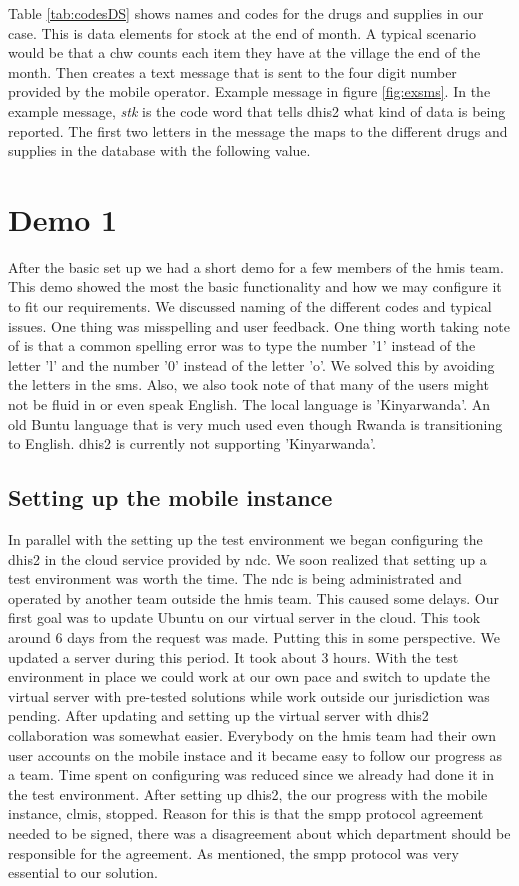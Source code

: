 Table \ref{tab:codesDS} shows names and codes for the drugs and supplies in our case. 
This is data elements for stock at the end of month.
A typical scenario would be that a \gls{chw} counts each item they have at the village the end of the month. Then creates a text message that is sent to the four digit number provided by the mobile operator. Example message in figure \ref{fig:exsms}. In the example message, \textit{stk} is the code word that tells \gls{dhis2} what kind of data is being reported. The first two letters in the message the maps to the different drugs and supplies in the database with the following value.  

\section{Demo 1}
After the basic set up we had a short demo for a few members of the \gls{hmis} team. 
This demo showed the most the basic functionality and how we may configure it to fit our requirements. We discussed naming of the different codes and typical issues. One thing was misspelling and user feedback. 
One thing worth taking note of is that a common spelling error was to type the number '1' instead of the letter 'l' and the number '0' instead of the letter 'o'. We solved this by avoiding the letters in the \gls{sms}. Also, we also took note of that many of the users might not be fluid in or even speak English. The local language is 'Kinyarwanda'. An old Buntu language that is very much used even though Rwanda is transitioning to English. \gls{dhis2} is currently not supporting 'Kinyarwanda'.

\subsection{Setting up the mobile instance}
In parallel with the setting up the test environment we began configuring the \gls{dhis2} in the cloud service provided by \gls{ndc}. 
We soon realized that setting up a test environment was worth the time. 
The \gls{ndc} is being administrated and operated by another team outside the \gls{hmis} team. 
This caused some delays. Our first goal was to update Ubuntu on our virtual server in the cloud. 
This took around 6 days from the request was made. Putting this in some perspective. We updated a server during this period. It took about 3 hours. With the test environment in place we could work at our own pace and switch to update the virtual server with pre-tested solutions while work outside our jurisdiction was pending. After updating and setting up the virtual server with \gls{dhis2} collaboration was somewhat easier. Everybody on the \gls{hmis} team had their own user accounts on the mobile instace and it became easy to follow our progress as a team. Time spent on configuring was reduced since we already had done it in the test environment.
After setting up \gls{dhis2}, the our progress with the mobile instance, \gls{clmis}, stopped. 
Reason for this is that the \gls{smpp} protocol agreement needed to be signed, there was a disagreement about which department should be responsible for the agreement. As mentioned, the \gls{smpp} protocol was very essential to our solution. 


